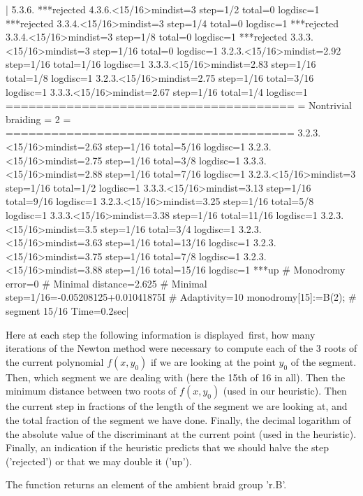 |    5.3.6. ***rejected
    4.3.6.<15/16>mindist=3 step=1/2 total=0 logdisc=1 ***rejected
    3.3.4.<15/16>mindist=3 step=1/4 total=0 logdisc=1 ***rejected
    3.3.4.<15/16>mindist=3 step=1/8 total=0 logdisc=1 ***rejected
    3.3.3.<15/16>mindist=3 step=1/16 total=0 logdisc=1
    3.2.3.<15/16>mindist=2.92 step=1/16 total=1/16 logdisc=1
    3.3.3.<15/16>mindist=2.83 step=1/16 total=1/8 logdisc=1
    3.2.3.<15/16>mindist=2.75 step=1/16 total=3/16 logdisc=1
    3.3.3.<15/16>mindist=2.67 step=1/16 total=1/4 logdisc=1
    ======================================
    =    Nontrivial braiding = 2         =
    ======================================
    3.2.3.<15/16>mindist=2.63 step=1/16 total=5/16 logdisc=1
    3.2.3.<15/16>mindist=2.75 step=1/16 total=3/8 logdisc=1
    3.3.3.<15/16>mindist=2.88 step=1/16 total=7/16 logdisc=1
    3.2.3.<15/16>mindist=3 step=1/16 total=1/2 logdisc=1
    3.3.3.<15/16>mindist=3.13 step=1/16 total=9/16 logdisc=1
    3.2.3.<15/16>mindist=3.25 step=1/16 total=5/8 logdisc=1
    3.3.3.<15/16>mindist=3.38 step=1/16 total=11/16 logdisc=1
    3.2.3.<15/16>mindist=3.5 step=1/16 total=3/4 logdisc=1
    3.2.3.<15/16>mindist=3.63 step=1/16 total=13/16 logdisc=1
    3.2.3.<15/16>mindist=3.75 step=1/16 total=7/8 logdisc=1
    3.2.3.<15/16>mindist=3.88 step=1/16 total=15/16 logdisc=1 ***up
    # Monodromy error=0
    # Minimal distance=2.625
    # Minimal step=1/16=-0.05208125+0.01041875I
    # Adaptivity=10
    monodromy[15]:=B(2);
    # segment 15/16 Time=0.2sec|

Here at each  step the following information is  displayed\:\ first, how
many iterations of  the Newton method were necessary to  compute each of
the 3  roots of the current  polynomial $f(x,y_0)$ if we  are looking at
the point $y_0$ of the segment.  Then, which segment we are dealing with
(here the  15th of  16 in  all). Then the  minimum distance  between two
roots of  $f(x,y_0)$ (used in our  heuristic). Then the current  step in
fractions of the length of the segment  we are looking at, and the total
fraction of the segment we have  done. Finally, the decimal logarithm of
the absolute  value of the discriminant  at the current point  (used in
the heuristic). Finally, an indication if the heuristic predicts that we
should  halve the  step  ('\*\*\*rejected')  or that  we  may double  it
('\*\*\*up').

The function returns an element of the ambient braid group 'r.B'.


